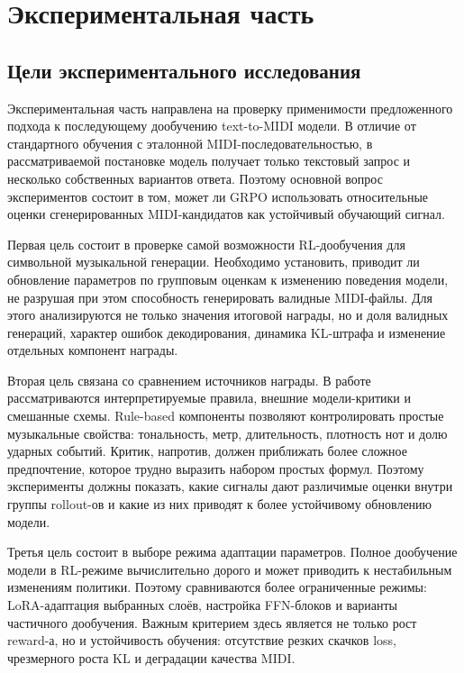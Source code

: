 \documentclass[a4paper,12pt]{extarticle}
\begin{document}
\section{Экспериментальная часть}

\subsection{Цели экспериментального исследования}

Экспериментальная часть направлена на проверку применимости
предложенного подхода к последующему дообучению text-to-MIDI модели.
В отличие от стандартного обучения с эталонной MIDI-последовательностью,
в рассматриваемой постановке модель получает только текстовый запрос и
несколько собственных вариантов ответа. Поэтому основной вопрос
экспериментов состоит в том, может ли GRPO использовать относительные
оценки сгенерированных MIDI-кандидатов как устойчивый обучающий сигнал.

Первая цель состоит в проверке самой возможности RL-дообучения для
символьной музыкальной генерации. Необходимо установить, приводит ли
обновление параметров по групповым оценкам к изменению поведения модели,
не разрушая при этом способность генерировать валидные MIDI-файлы. Для
этого анализируются не только значения итоговой награды, но и доля
валидных генераций, характер ошибок декодирования, динамика KL-штрафа и
изменение отдельных компонент награды.

Вторая цель связана со сравнением источников награды. В работе
рассматриваются интерпретируемые правила, внешние модели-критики и
смешанные схемы. Rule-based компоненты позволяют контролировать простые
музыкальные свойства: тональность, метр, длительность, плотность нот и
долю ударных событий. Критик, напротив, должен приближать более сложное
предпочтение, которое трудно выразить набором простых формул. Поэтому
эксперименты должны показать, какие сигналы дают различимые оценки
внутри группы rollout-ов и какие из них приводят к более устойчивому
обновлению модели.

Третья цель состоит в выборе режима адаптации параметров. Полное
дообучение модели в RL-режиме вычислительно дорого и может приводить к
нестабильным изменениям политики. Поэтому сравниваются более ограниченные
режимы: LoRA-адаптация выбранных слоёв, настройка FFN-блоков и варианты
частичного дообучения. Важным критерием здесь является не только рост
reward-а, но и устойчивость обучения: отсутствие резких скачков loss,
чрезмерного роста KL и деградации качества MIDI.
\end{document}
